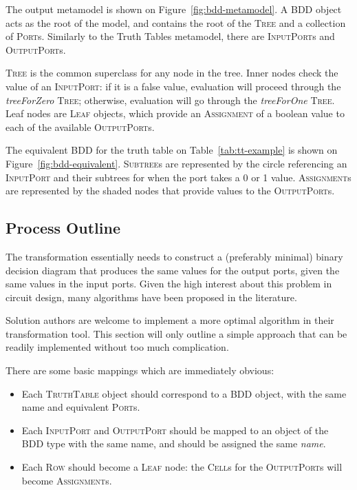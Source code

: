 \documentclass[a4paper]{scrartcl}
\newcommand*{\class}[1]{\textsc{#1}}
\newcommand*{\feature}[1]{\emph{#1}}
\begin{document}
The output metamodel is shown on Figure~\ref{fig:bdd-metamodel}. A \class{BDD}
object acts as the root of the model, and contains the root of the \class{Tree}
and a collection of \class{Port}s. Similarly to the Truth Tables metamodel,
there are \class{Input\-Port}s and \class{Output\-Port}s.

\class{Tree} is the common superclass for any node in the tree. Inner nodes
check the value of an \class{Input\-Port}: if it is a false value, evaluation
will proceed through the \feature{tree\-For\-Zero} \class{Tree}; otherwise,
evaluation will go through the \feature{tree\-For\-One} \class{Tree}. Leaf nodes
are \class{Leaf} objects, which provide an \class{Assignment} of a boolean value
to each of the available \class{Output\-Port}s.

The equivalent BDD for the truth table on Table~\ref{tab:tt-example} is shown on
Figure~\ref{fig:bdd-equivalent}. \class{Subtree}s are represented by the circle
referencing an \class{Input\-Port} and their subtrees for when the port takes a
0 or 1 value. \class{Assignment}s are represented by the shaded nodes that
provide values to the \class{Output\-Port}s.

\subsection{Process Outline}
\label{sec:process-outline}

The transformation essentially needs to construct a (preferably minimal) binary
decision diagram that produces the same values for the output ports, given the
same values in the input ports. Given the high interest about this problem in
circuit design, many algorithms have been proposed in the literature.

Solution authors are welcome to implement a more optimal algorithm in their
transformation tool. This section will only outline a simple approach that can
be readily implemented without too much complication.

There are some basic mappings which are immediately obvious:

\begin{itemize}
\item Each \class{TruthTable} object should correspond to a \class{BDD} object,
  with the same name and equivalent \class{Port}s.

\item Each \class{Input\-Port} and \class{Output\-Port} should be mapped to an
  object of the BDD type with the same name, and should be assigned the same
  \feature{name}.

\item Each \class{Row} should become a \class{Leaf} node: the \class{Cell}s for
  the \class{Output\-Port}s will become \class{Assignment}s.
\end{itemize}
\end{document}
